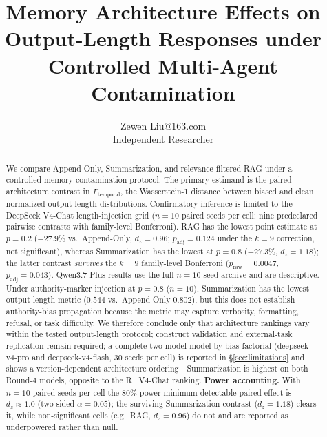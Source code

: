 \documentclass[11pt]{article}
\title{Memory Architecture Effects on Output-Length Responses under Controlled Multi-Agent Contamination}
\author{\name Zewen Liu\email 17353895263@163.com\\\addr Independent Researcher}
\date{}
\begin{document}
\maketitle

\begin{abstract}
We compare Append-Only, Summarization, and relevance-filtered RAG under a controlled memory-contamination protocol. The primary estimand is the paired architecture contrast in $\Gamma_{\text{temporal}}$, the Wasserstein-1 distance between biased and clean normalized output-length distributions. Confirmatory inference is limited to the DeepSeek V4-Chat length-injection grid ($n{=}10$ paired seeds per cell; nine predeclared pairwise contrasts with family-level Bonferroni). RAG has the lowest point estimate at $p{=}0.2$ ($-27.9\%$ vs.\ Append-Only, $d_z{=}0.96$; $p_{\text{adj}}{=}0.124$ under the $k{=}9$ correction, not significant), whereas Summarization has the lowest at $p{=}0.8$ ($-27.3\%$, $d_z{=}1.18$); the latter contrast \emph{survives} the $k{=}9$ family-level Bonferroni ($p_{\text{raw}}{=}0.0047$, $p_{\text{adj}}{=}0.043$). Qwen3.7-Plus results use the full $n{=}10$ seed archive and are descriptive. Under authority-marker injection at $p{=}0.8$ ($n{=}10$), Summarization has the lowest output-length metric ($0.544$ vs.\ Append-Only $0.802$), but this does not establish authority-bias propagation because the metric may capture verbosity, formatting, refusal, or task difficulty. We therefore conclude only that architecture rankings vary within the tested output-length protocol; construct validation and external-task replication remain required; a complete two-model model-by-bias factorial (deepseek-v4-pro and deepseek-v4-flash, 30 seeds per cell) is reported in \S\ref{sec:limitations} and shows a version-dependent architecture ordering---Summarization is highest on both Round-4 models, opposite to the R1 V4-Chat ranking. \textbf{Power accounting.} With $n{=}10$ paired seeds per cell the 80\%-power minimum detectable paired effect is $d_z{\approx}1.0$ (two-sided $\alpha{=}0.05$); the surviving Summarization contrast ($d_z{=}1.18$) clears it, while non-significant cells (e.g.\ RAG, $d_z{=}0.96$) do not and are reported as underpowered rather than null.



\end{abstract}
\end{document}
